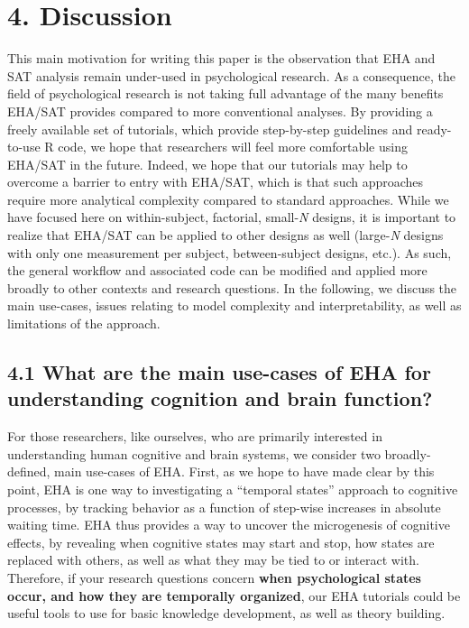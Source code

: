 \documentclass[
  english,
  man, donotrepeattitle,floatsintext]{apa6}
\begin{document}
\section{4. Discussion}\label{discussion}

This main motivation for writing this paper is the observation that EHA and SAT analysis remain under-used in psychological research. As a consequence, the field of psychological research is not taking full advantage of the many benefits EHA/SAT provides compared to more conventional analyses. By providing a freely available set of tutorials, which provide step-by-step guidelines and ready-to-use R code, we hope that researchers will feel more comfortable using EHA/SAT in the future. Indeed, we hope that our tutorials may help to overcome a barrier to entry with EHA/SAT, which is that such approaches require more analytical complexity compared to standard approaches. While we have focused here on within-subject, factorial, small-\emph{N} designs, it is important to realize that EHA/SAT can be applied to other designs as well (large-\emph{N} designs with only one measurement per subject, between-subject designs, etc.). As such, the general workflow and associated code can be modified and applied more broadly to other contexts and research questions. In the following, we discuss the main use-cases, issues relating to model complexity and interpretability, as well as limitations of the approach.

\subsection{4.1 What are the main use-cases of EHA for understanding cognition and brain function?}\label{what-are-the-main-use-cases-of-eha-for-understanding-cognition-and-brain-function}

For those researchers, like ourselves, who are primarily interested in understanding human cognitive and brain systems, we consider two broadly-defined, main use-cases of EHA. First, as we hope to have made clear by this point, EHA is one way to investigating a ``temporal states'' approach to cognitive processes, by tracking behavior as a function of step-wise increases in absolute waiting time. EHA thus provides a way to uncover the microgenesis of cognitive effects, by revealing when cognitive states may start and stop, how states are replaced with others, as well as what they may be tied to or interact with. Therefore, if your research questions concern \textbf{when psychological states occur, and how they are temporally organized}, our EHA tutorials could be useful tools to use for basic knowledge development, as well as theory building.
\end{document}
